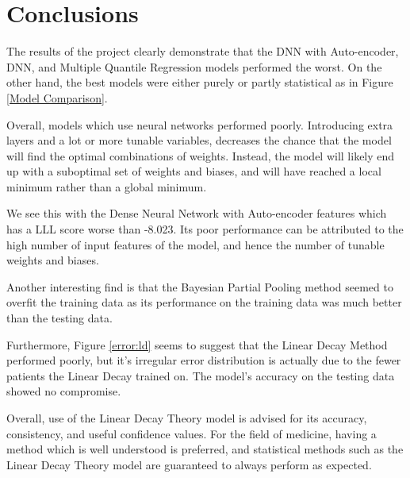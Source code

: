 \documentclass[12pt]{article}
\begin{document}
\section{Conclusions}


The results of the project clearly demonstrate that the DNN with Auto-encoder, DNN, and Multiple Quantile Regression models performed the worst.
On the other hand, the best models were either purely or partly statistical as in Figure \ref{Model Comparison}. 

Overall, models which use neural networks performed poorly.
Introducing extra layers and a lot or more tunable variables, decreases the chance that the model will find the optimal combinations of weights.
Instead, the model will likely end up with a suboptimal set of weights and biases, and will have reached a local minimum rather than a global minimum.

We see this with the Dense Neural Network with Auto-encoder features which has a LLL score worse than -8.023.
Its poor performance can be attributed to the high number of input features of the model, and hence the number of tunable weights and biases.

Another interesting find is that the Bayesian Partial Pooling method seemed to overfit the training data as its performance on the training data was much better than the testing data.

Furthermore, Figure \ref{error:ld} seems to suggest that the Linear Decay Method performed poorly, but it's irregular error distribution is actually due to the fewer patients the Linear Decay trained on.
The model's accuracy on the testing data showed no compromise.

Overall, use of the Linear Decay Theory model is advised for its accuracy, consistency, and useful confidence values.
For the field of medicine, having a method which is well understood is preferred, and statistical methods such as the Linear Decay Theory model are guaranteed to always perform as expected.
\end{document}
